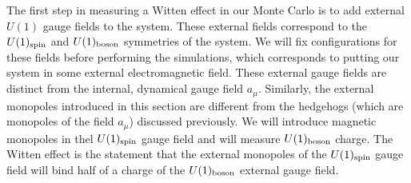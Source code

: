 \documentclass[prb,twocolumn]{revtex4-1}
\begin{document}
The first step in measuring a Witten effect in our Monte Carlo is to add external $U(1)$ gauge fields to the system. These external fields correspond to the $U(1)_{\rm spin}$ and $U(1)_{\rm boson}$ symmetries of the system. We will fix configurations for these fields before performing the simulations, which corresponds to putting our system in some external electromagnetic field. These external gauge fields are distinct from the internal, dynamical gauge field $a_\mu$. Similarly, the external monopoles introduced in this section are different from the hedgehogs (which are monopoles of the field $a_\mu$) discussed previously. We will introduce magnetic monopoles in thel $U(1)_{\rm spin}$ gauge field and will measure $U(1)_{\rm boson}$ charge. The Witten effect is the statement that the external monopoles of the $U(1)_{\rm spin}$ gauge field will bind half of a charge of the $U(1)_{\rm boson}$ external gauge field.
\end{document}
